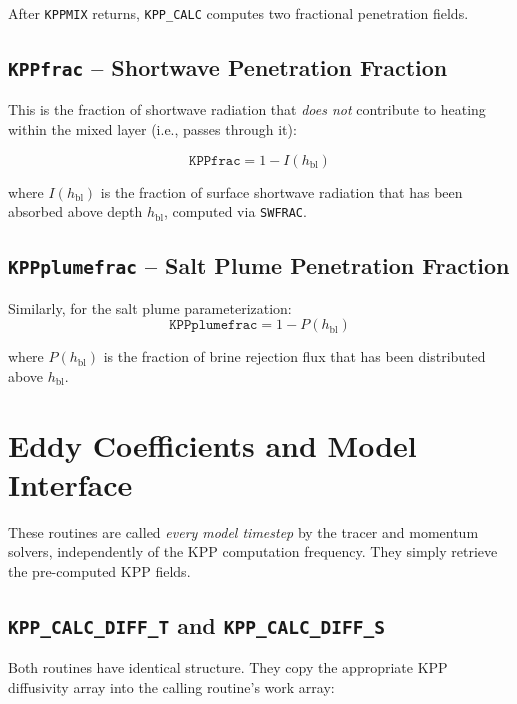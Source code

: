 \documentclass[12pt,letterpaper]{article}
\newcommand{\hbl}{h_{\mathrm{bl}}}
\begin{document}
After \texttt{KPPMIX} returns, \texttt{KPP\_CALC} computes two  
fractional penetration fields.  
  
\subsection{\texttt{KPPfrac} -- Shortwave Penetration Fraction}  
  
This is the fraction of shortwave radiation that \textit{does not}  
contribute to heating within the mixed layer (i.e., passes through it):  
  
\begin{equation}  
\texttt{KPPfrac} = 1 - I(\hbl)  
\end{equation}  
  
where $I(\hbl)$ is the fraction of surface shortwave radiation that  
has been absorbed above depth $\hbl$, computed via \texttt{SWFRAC}.  
  
\subsection{\texttt{KPPplumefrac} -- Salt Plume Penetration Fraction}  
  
Similarly, for the salt plume parameterization:  
\begin{equation}  
\texttt{KPPplumefrac} = 1 - P(\hbl)  
\end{equation}  
  
where $P(\hbl)$ is the fraction of brine rejection flux that has been  
distributed above $\hbl$.  
  
\section{Eddy Coefficients and Model Interface}  
\label{sec:model_interface}  
  
These routines are called \textit{every model timestep} by the  
tracer and momentum solvers, independently of the KPP computation  
frequency. They simply retrieve the pre-computed KPP fields.  
  
\subsection{\texttt{KPP\_CALC\_DIFF\_T} and \texttt{KPP\_CALC\_DIFF\_S}}  
  
Both routines have identical structure. They copy the appropriate  
KPP diffusivity array into the calling routine's work array:  
  
\end{document}

